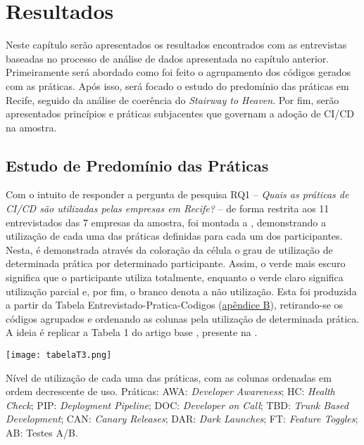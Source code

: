 
\chapter{Resultados}

Neste capítulo serão apresentados os resultados encontrados com as entrevistas baseadas no processo de análise de dados apresentada no capítulo anterior. Primeiramente será abordado como foi feito o agrupamento dos códigos gerados com as práticas. Após isso, será focado o estudo do predomínio das práticas em Recife, seguido da análise de coerência do \emph{Stairway to Heaven}. Por fim, serão apresentados princípios e práticas subjacentes que governam a adoção de CI/CD na amostra.


\section{Estudo de Predomínio das Práticas}

Com o intuito de responder a pergunta de pesquisa RQ1 -- \emph{Quais as práticas de CI/CD são utilizadas pelas empresas em Recife?} -- de forma restrita aos 11 entrevistados das 7 empresas da amostra, foi montada a , demonstrando a utilização de cada uma das práticas definidas para cada um dos participantes. Nesta, é demonstrada através da coloração da célula o grau de utilização de determinada prática por determinado participante. Assim, o verde mais escuro significa que o participante utiliza totalmente, enquanto o verde claro significa utilização parcial e, por fim, o branco denota a não utilização. Esta foi produzida a partir da Tabela Entrevistado-Pratica-Codigos (\hyperlink{tabela1}{apêndice B}), retirando-se os códigos agrupados e ordenando as colunas pela utilização de determinada prática. A ideia é replicar a Tabela 1 do artigo base \cite{empiricalStudy2016}, presente na .

\begin{table}[ht]
\begin{center}
\texttt{[image: tabelaT3.png]}
\end{center}
\caption[Nível de utilização das práticas, com as colunas em ordem decrescente de uso]{
    Nível de utilização de cada uma das práticas, com as colunas ordenadas em ordem decrescente de uso. Práticas: AWA: \emph{Developer Awareness}; HC: \emph{Health Check}; PIP: \emph{Deployment Pipeline}; DOC: \emph{Developer on Call}; TBD: \emph{Trunk Based Development}; CAN: \emph{Canary Releases}; DAR: \emph{Dark Launches}; FT: \emph{Feature Toggles}; AB: Testes A/B.
}\label{tabela_t3}
\end{table}

